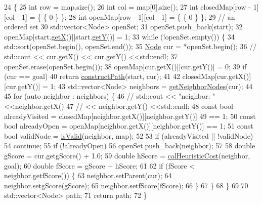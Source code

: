 \begin{DoxyCode}
24                                                                            \{
25   \textcolor{keywordtype}{int} row = map.size();
26   \textcolor{keywordtype}{int} col = map[0].size();
27   \textcolor{keywordtype}{int} closedMap[row - 1][col - 1] = \{ \{ 0 \} \};
28   \textcolor{keywordtype}{int} openMap[row - 1][col - 1] = \{ \{ 0 \} \};
29   \textcolor{comment}{//  an ordered set}
30   std::vector<Node> openSet;
31   openSet.push\_back(start);
32   openMap[start.\hyperlink{classNode_aa45b6294ee8c7aafdf5a1450f879c598}{getX}()][start.\hyperlink{classNode_a81610ad138e2ac2cca79603032aaafc1}{getY}()] = 1;
33   \textcolor{keywordflow}{while} (!openSet.empty()) \{
34     std::sort(openSet.begin(), openSet.end());
35     \hyperlink{classNode}{Node} cur = *openSet.begin();
36     \textcolor{comment}{//  std::cout << cur.getX() << cur.getY() <<std::endl;}
37     openSet.erase(openSet.begin());
38     openMap[cur.getX()][cur.getY()] = 0;
39     \textcolor{keywordflow}{if} (cur == goal)
40       \textcolor{keywordflow}{return} \hyperlink{classAStarPathFinder_aef2b14372e6756807849abf96fa5c058}{constructPath}(start, cur);
41 
42     closedMap[cur.getX()][cur.getY()] = 1;
43     std::vector<Node> neighbors = \hyperlink{classAStarPathFinder_a9c4397d6069006adb6218b027858859e}{getNeighborNodes}(cur);
44 
45     \textcolor{keywordflow}{for} (\textcolor{keyword}{auto} neighbor : neighbors) \{
46       \textcolor{comment}{//  std::cout << "neighbor: "<<neighbor.getX()}
47       \textcolor{comment}{//  << neighbor.getY() <<std::endl;}
48       \textcolor{keyword}{const} \textcolor{keywordtype}{bool} alreadyVisited = closedMap[neighbor.getX()][neighbor.getY()]
49           == 1;
50       \textcolor{keyword}{const} \textcolor{keywordtype}{bool} alreadyOpen = openMap[neighbor.getX()][neighbor.getY()] == 1;
51       \textcolor{keyword}{const} \textcolor{keywordtype}{bool} validNode = \hyperlink{classAStarPathFinder_ade77a8c0b187355d2553cd42b128c2ae}{isValid}(neighbor, map);
52 
53       \textcolor{keywordflow}{if} (alreadyVisited || !validNode)
54         \textcolor{keywordflow}{continue};
55       \textcolor{keywordflow}{if} (!alreadyOpen)
56         openSet.push\_back(neighbor);
57 
58       \textcolor{keywordtype}{double} gScore = cur.getgScore() + 1.0;
59       \textcolor{keywordtype}{double} hScore = \hyperlink{classAStarPathFinder_ae5e628981264bd57b8e30e9aade75d3f}{calHeuristicCost}(neighbor, goal);
60       \textcolor{keywordtype}{double} fScore = gScore + hScore;
61 
62       \textcolor{keywordflow}{if} (fScore < neighbor.getfScore()) \{
63         neighbor.setParent(cur);
64         neighbor.setgScore(gScore);
65         neighbor.setfScore(fScore);
66       \}
67     \}
68   \}
69 
70   std::vector<Node> path;
71   \textcolor{keywordflow}{return} path;
72 \}
\end{DoxyCode}
